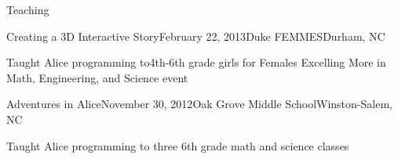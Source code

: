 \documentclass{resume} %
\begin{document}
\begin{rSection}{Teaching}

\begin{rSubsection}{Creating a 3D Interactive Story}{February 22, 2013}{Duke FEMMES}{Durham, NC}
\item Taught Alice programming to4th-6th grade girls for Females Excelling More in Math, Engineering, and Science event
\end{rSubsection}



\begin{rSubsection}{Adventures in Alice}{November 30, 2012}{Oak Grove Middle School}{Winston-Salem, NC}
\item Taught Alice programming to three 6th grade math and science classes
\end{rSubsection}

\end{rSection}

\end{document}
